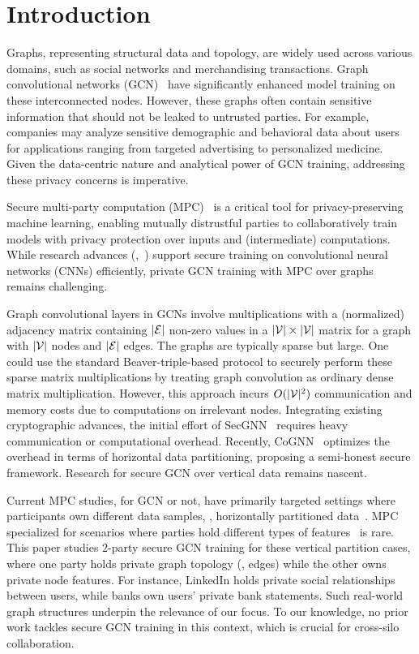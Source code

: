 \section{Introduction}
Graphs, representing structural data and topology, are widely used across various domains, such as social networks and merchandising transactions.
Graph convolutional networks (GCN)~\cite{iclr/KipfW17} have significantly enhanced model training on these interconnected nodes.
However, these graphs often contain sensitive information that should not be leaked to untrusted parties.
For example, companies may analyze sensitive demographic and behavioral data about users for applications ranging from targeted advertising to personalized medicine.
Given the data-centric nature and analytical power of GCN training, addressing these privacy concerns is imperative.

Secure multi-party computation (MPC)~\cite{crypto/ChaumDG87,crypto/ChenC06,eurocrypt/CiampiRSW22} is a critical tool for privacy-preserving machine learning, enabling mutually distrustful parties to collaboratively train models with privacy protection over inputs and (intermediate) computations.
While research advances (\eg,~\cite{ccs/RatheeRKCGRS20,uss/NgC21,sp21/TanKTW,uss/WatsonWP22,icml/Keller022,ccs/ABY318,folkerts2023redsec}) support secure training on convolutional neural networks (CNNs) efficiently, private GCN training with MPC over graphs remains challenging.

Graph convolutional layers in GCNs involve multiplications with a (normalized) adjacency matrix containing $|\mathcal{E}|$ non-zero values in a $|\mathcal{V}| \times |\mathcal{V}|$ matrix for a graph with $|\mathcal{V}|$ nodes and $|\mathcal{E}|$ edges.
The graphs are typically sparse but large.
One could use the standard Beaver-triple-based protocol to securely perform these sparse matrix multiplications by treating graph convolution as ordinary dense matrix multiplication.
However, this approach incurs $O(|\mathcal{V}|^2)$ communication and memory costs due to computations on irrelevant nodes.
%
Integrating existing cryptographic advances, the initial effort of SecGNN~\cite{tsc/WangZJ23,nips/RanXLWQW23} requires heavy communication or computational overhead.
Recently, CoGNN~\cite{ccs/ZouLSLXX24} optimizes the overhead in terms of  horizontal data partitioning, proposing a semi-honest secure framework.
Research for secure GCN over vertical data  remains nascent.

Current MPC studies, for GCN or not, have primarily targeted settings where participants own different data samples, \ie, horizontally partitioned data~\cite{ccs/ZouLSLXX24}.
MPC specialized for scenarios where parties hold different types of features~\cite{tkde/LiuKZPHYOZY24,icml/CastigliaZ0KBP23,nips/Wang0ZLWL23} is rare.
This paper studies $2$-party secure GCN training for these vertical partition cases, where one party holds private graph topology (\eg, edges) while the other owns private node features.
For instance, LinkedIn holds private social relationships between users, while banks own users' private bank statements.
Such real-world graph structures underpin the relevance of our focus.
To our knowledge, no prior work tackles secure GCN training in this context, which is crucial for cross-silo collaboration.


